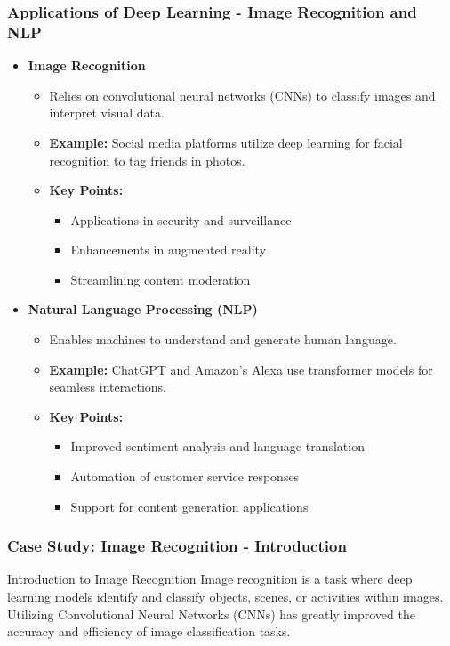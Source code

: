 \documentclass[aspectratio=169]{beamer}
\begin{document}
\begin{frame}[fragile]
    \frametitle{Applications of Deep Learning - Image Recognition and NLP}
    \begin{itemize}
        \item \textbf{Image Recognition}
        \begin{itemize}
            \item Relies on convolutional neural networks (CNNs) to classify images and interpret visual data.
            \item \textbf{Example:} Social media platforms utilize deep learning for facial recognition to tag friends in photos.
            \item \textbf{Key Points:}
                \begin{itemize}
                    \item Applications in security and surveillance
                    \item Enhancements in augmented reality
                    \item Streamlining content moderation
                \end{itemize}
        \end{itemize}

        \item \textbf{Natural Language Processing (NLP)}
        \begin{itemize}
            \item Enables machines to understand and generate human language.
            \item \textbf{Example:} ChatGPT and Amazon's Alexa use transformer models for seamless interactions.
            \item \textbf{Key Points:}
                \begin{itemize}
                    \item Improved sentiment analysis and language translation
                    \item Automation of customer service responses
                    \item Support for content generation applications
                \end{itemize}
        \end{itemize}
    \end{itemize}
\end{frame}

\begin{frame}[fragile]
    \frametitle{Case Study: Image Recognition - Introduction}
    \begin{block}{Introduction to Image Recognition}
        Image recognition is a task where deep learning models identify and classify objects, scenes, or activities within images. Utilizing Convolutional Neural Networks (CNNs) has greatly improved the accuracy and efficiency of image classification tasks.
    \end{block}
\end{frame}
\end{document}
